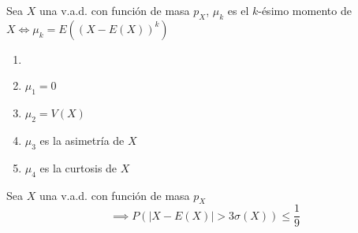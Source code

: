 \begin{defn}[Momentos de $X$]
	Sea $X$ una v.a.d. con función de masa $p_X$, $\mu_k$ es el $k$-ésimo momento de $X \iff \mu_k= E\left((X-E(X))^k\right)$
\end{defn}

\begin{obs}
	\begin{enumerate}
		\item[]
		\item $\mu_1=0$
		\item $\mu_2=V(X)$
		\item $\mu_3$ es la asimetría de $X$
		\item $\mu_4$ es la curtosis de $X$
	\end{enumerate}
\end{obs}

\begin{teo}
	Sea $X$ una v.a.d. con función de masa $p_X$
	\[\implies P(|X-E(X)| > 3\sigma(X))\leq \frac{1}{9}\]
\end{teo}



